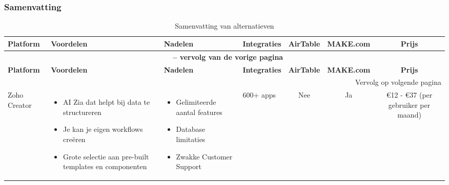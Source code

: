 \subsubsection*{Samenvatting}
\begin{longtable}{p{2.2cm} p{4.4cm} p{3.4cm} p{2.2cm} c c c}
    \caption{Samenvatting van alternatieven} \label{samenvatting-alternatieven} \\
    \toprule
    \textbf{Platform} & \textbf{Voordelen} & \textbf{Nadelen} & \textbf{Integraties} & \textbf{AirTable} & \textbf{MAKE.com} & \textbf{Prijs} \\
    \midrule
    \endfirsthead

    \multicolumn{7}{c}{{\bfseries \tablename\ \thetable{} -- vervolg van de vorige pagina}} \\
    \toprule
    \textbf{Platform} & \textbf{Voordelen} & \textbf{Nadelen} & \textbf{Integraties} & \textbf{AirTable} & \textbf{MAKE.com} & \textbf{Prijs} \\
    \midrule
    \endhead

    \midrule
    \multicolumn{7}{r}{{Vervolg op volgende pagina}} \\
    \endfoot

    \bottomrule
    \endlastfoot

    Zoho Creator & 
    \begin{itemize}
        \item AI Zia dat helpt bij data te structureren
        \item Je kan je eigen workflows creëren
        \item Grote selectie aan pre-built templates en componenten
    \end{itemize} & 
    \begin{itemize}
        \item Gelimiteerde aantal features
        \item Database limitaties
        \item Zwakke Customer Support
    \end{itemize} &
    600+ apps &
    Nee &
    Ja &
    €12 - €37 (per gebruiker per maand)\\


\end{longtable}
